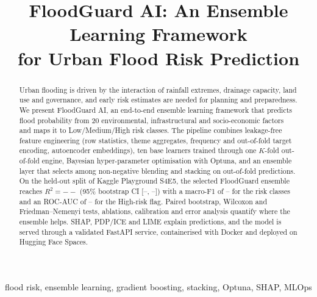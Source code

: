 \documentclass[conference]{IEEEtran}
\providecommand{\FGDataSource}{Kaggle Playground S4E5}
\providecommand{\FGFinalModel}{FloodGuard ensemble}
\providecommand{\FGFinalRtwo}{--}\providecommand{\FGFinalRtwoLo}{--}\providecommand{\FGFinalRtwoHi}{--}
\providecommand{\FGMacroFone}{--}\providecommand{\FGRocAuc}{--}\providecommand{\FGPrAuc}{--}
\begin{document}
\title{FloodGuard AI: An Ensemble Learning Framework\\for Urban Flood Risk Prediction}

\author{
}

\maketitle

\begin{abstract}
Urban flooding is driven by the interaction of rainfall extremes, drainage capacity, land use and governance, and
early risk estimates are needed for planning and preparedness. We present FloodGuard AI, an end-to-end ensemble
learning framework that predicts flood probability from 20 environmental, infrastructural and socio-economic factors
and maps it to Low/Medium/High risk classes. The pipeline combines leakage-free feature engineering (row statistics,
theme aggregates, frequency and out-of-fold target encoding, autoencoder embeddings), ten base learners trained through
one $K$-fold out-of-fold engine, Bayesian hyper-parameter optimisation with Optuna, and an ensemble layer that selects
among non-negative blending and stacking on out-of-fold predictions. On the held-out split of \FGDataSource, the
selected \FGFinalModel{} reaches $R^2=\FGFinalRtwo$ (95\% bootstrap CI [\FGFinalRtwoLo, \FGFinalRtwoHi]) with a
macro-F1 of \FGMacroFone{} for the risk classes and an ROC-AUC of \FGRocAuc{} for the High-risk flag. Paired
bootstrap, Wilcoxon and Friedman--Nemenyi tests, ablations, calibration and error analysis quantify where the ensemble
helps. SHAP, PDP/ICE and LIME explain predictions, and the model is served through a validated FastAPI service,
containerised with Docker and deployed on Hugging Face Spaces.
\end{abstract}

\begin{IEEEkeywords}
flood risk, ensemble learning, gradient boosting, stacking, Optuna, SHAP, MLOps
\end{IEEEkeywords}

\end{document}
